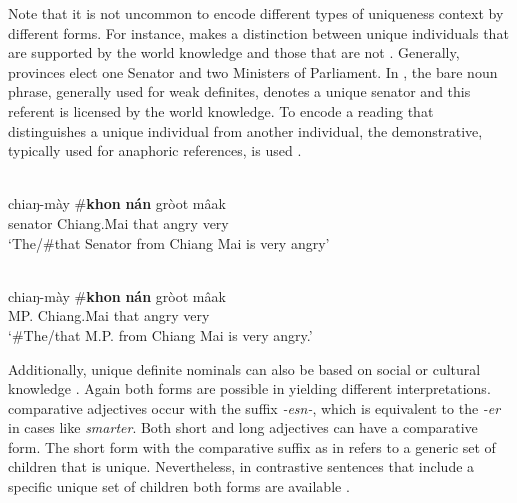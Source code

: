 \documentclass[output=paper,
modfonts
]{langscibook}
\begin{document}
Note that it is not uncommon to encode different types of uniqueness context by different forms. For instance,  makes a distinction between unique individuals that are supported by the world knowledge and those that are not \citep{Jenks2015}. Generally,  provinces elect one Senator and two Ministers of Parliament. In , the bare noun phrase, generally used for weak definites, denotes a unique senator and this referent is licensed by the world knowledge. To encode a reading that distinguishes a unique individual from another individual, the demonstrative, typically used for anaphoric references, is used .

\begin{exe}
	\ex \label{ex:sereikaite:48}
	\\
	 {chiaŋ-mày} {\op}\textnormal{\#}\textbf{khon} \textbf{nán}{\cp} {gròot} {mâak}\\
	senator Chiang.Mai  {that} angry very\\
	\trans `The/\#that Senator from Chiang Mai is very angry' \citep[107]{Jenks2015}
\end{exe}

\begin{exe}
	\ex \label{ex:sereikaite:49}
	 \\
	 {chiaŋ-m\`ay} \textnormal{\#}{\op}\textbf{khon} \textbf{nán}{\cp} {gròot} {mâak}\\
	MP. Chiang.Mai  {that} angry very\\
	\trans `\#The/that M.P. from Chiang Mai is very angry.' \citep[107]{Jenks2015}
\end{exe}

Additionally, unique definite nominals can also be based on social or cultural knowledge \citep{Hawkins1978}. Again both forms are possible in  yielding different interpretations.  comparative adjectives occur with the suffix \textit{-esn-}, which is equivalent to the  \textit{-er} in cases like \textit{smarter}. Both short and long adjectives can have a comparative form. The short form with the comparative suffix as in  refers to a generic set of children that is unique. Nevertheless, in contrastive sentences that include a specific unique set of children both forms are available . 
 
\end{document}
